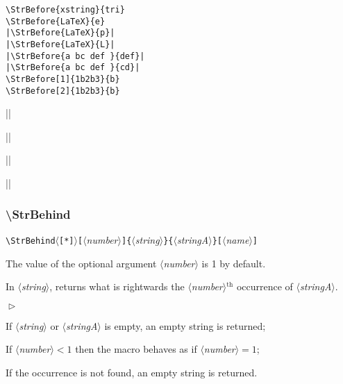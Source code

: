 \documentclass[a4paper,10pt]{article}
\newcommand\argu[1]{$\langle$\textit{#1}$\rangle$}
\newcommand\ARGU[1]{\texttt{\{}\argu{#1}\texttt{\}}}
\newcommand\arguC[1]{\texttt{[}\argu{#1}\texttt{]}}
\newcommand\etoile{$\langle$\texttt{[*]}$\rangle$}
\newenvironment{Conditions}[1][1cm]%
{\begin{list}%
	{$\vartriangleright$}%
	{\setlength{\leftmargin}{#1}
	 \setlength{\itemsep}{0pt}
	 \setlength{\parsep}{0pt}
	 \setlength{\topsep}{2ptplus3ptminus2pt}
	}}%
{\end{list}}
\renewcommand\th{${}^\text{th}$\xspace}
\newcommand\styleexemple{\small\vskip4pt}
\newcommand\verbinline{\lstinline[basicstyle=\normalsize\ttfamily]}
\begin{document}
\begin{minipage}[t]{0.65\linewidth}
\begin{lstlisting}
\StrBefore{xstring}{tri}
\StrBefore{LaTeX}{e}
|\StrBefore{LaTeX}{p}|
|\StrBefore{LaTeX}{L}|
|\StrBefore{a bc def }{def}|
|\StrBefore{a bc def }{cd}|
\StrBefore[1]{1b2b3}{b}
\StrBefore[2]{1b2b3}{b}
\end{lstlisting}%
\end{minipage}\hfill
\begin{minipage}[t]{0.35\linewidth}
	\styleexemple
	\par
	\par
	||\par
	||\par
	||\par
	||\par
	\par
\end{minipage}%

\subsubsection{\ttfamily\textbackslash StrBehind}

\verbinline|\StrBehind|\etoile\arguC{number}\ARGU{string}\ARGU{stringA}\arguC{name}
\smallskip

The value of the optional argument \argu{number} is 1 by default.\par\smallskip

In \argu{string}, returns what is rightwards the \argu{number}\th occurrence of \argu{stringA}.\medskip

\begin{Conditions}
\item If \argu{string} or \argu{stringA} is empty, an empty string is returned;
\item If \argu{number}${}<1$ then the macro behaves as if \argu{number}${}=1$;
\item If the occurrence is not found, an empty string is returned.
\end{Conditions}
\end{document}
